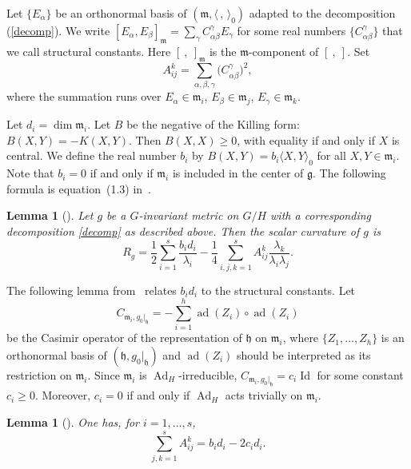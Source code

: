 \documentclass[10pt,a4paper]{amsart}
\newtheorem{Lemma}[Theorem]{Lemma}
 { \theoremstyle{definition}
\newtheorem{Definition}[Theorem]{Definition}
\newtheorem{Remark}[Theorem]{Remark} }
\begin{document}
 Let $\{E_{\alpha}\}$ be an orthonormal basis of $(\mathfrak{m}, \langle \,,\,\rangle_0)$ adapted to the decomposition (\ref{decomp}). We write $[E_{\alpha},E_{\beta}]_{\mathfrak{m}}=\sum_{\gamma} C_{\alpha\beta}^{\gamma}E_{\gamma}$ for some real numbers $\big\{ C_{\alpha\beta}^{\gamma} \big\}$ that we call structural constants. Here $[\ ,\ ]_{\mathfrak{m}}$ is the $\mathfrak{m}$-component of $[\ , \ ]$.
Set
\[ A_{ij}^{k}=\sum_{\alpha,\beta,\gamma}\big(C_{\alpha\beta}^{\gamma}\big)^2,\]
where the summation runs over $E_{\alpha} \in \mathfrak{m}_i$, $E_{\beta} \in \mathfrak{m}_j$, $E_{\gamma} \in \mathfrak{m}_k$.

Let $d_i=\dim \mathfrak{m}_i$. Let $B$ be the negative of the Killing form: $B(X, Y)=-K(X, Y)$. Then $B(X, X)\geq 0$, with equality if and only if $X$ is central. We define the real number $b_i$ by $B(X,Y)=b_i\langle X,Y\rangle_0$ for all $X,Y\in \mathfrak{m}_i$. Note that $b_i=0$ if and only if $\mathfrak{m}_i$ is included in the center of $\mathfrak{g}$. The following formula is equation~(1.3) in~\cite{12}.

\begin{Lemma}[{\cite[equation~(1.3)]{12}}] \label{wz1}
	Let $g$ be a $G$-invariant metric on $G/H$ with a corresponding decomposition
\eqref{decomp} as described above. Then the scalar curvature of $g$ is
	\begin{equation*} %
	R_g=\frac{1}{2} \sum_{i=1}^s \frac{b_id_i}{\lambda_i} - \frac{1}{4} \sum_{i, j, k=1}^s A^k_{ij} \frac{\lambda_{k}}{\lambda_i\lambda_{j}}.
	\end{equation*}
\end{Lemma}

The following lemma from~\cite{12} relates $b_id_i$ to the structural constants. Let
\[ C_{\mathfrak{m}_i, g_0|_{\mathfrak{h}}}= - \sum_{i=1}^h \operatorname{ad}(Z_i) \circ \operatorname{ad}(Z_i)\] be the Casimir operator of the representation of $\mathfrak{h}$ on $\mathfrak{m}_i$, where $\{Z_1, \dots, Z_h\}$ is an orthonormal basis of $(\mathfrak{h}, g_0|_{\mathfrak{h}})$ and $\operatorname{ad}(Z_i)$ should be interpreted as its restriction on $\mathfrak{m}_i$. Since $\mathfrak{m}_i$ is $\operatorname{Ad}_H$-irreducible, $C_{\mathfrak{m}_i, g_0|_{\mathfrak{h}}} =c_i \operatorname{Id}$ for some constant $c_i \geq 0$. Moreover, $c_i=0$ if and only if $\operatorname{Ad}_H$ acts trivially on $\mathfrak{m}_i$.
\begin{Lemma}[{\cite[Lemma 1.5]{16}}] \label{wz2}
	One has, for $i=1, \dots, s$,
	\begin{equation*} %
	\sum_{j,k=1}^s A^k_{ij}=b_id_i-2c_id_i.
	\end{equation*}
\end{Lemma}
\end{document}
